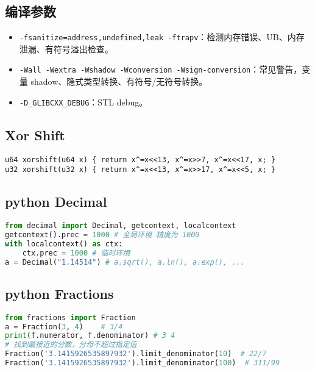\documentclass[a4paper,landscape,twocolumn]{ctexart}
\begin{document}
\subsection{编译参数}

\begin{itemize}
\item \texttt{-fsanitize=address,undefined,leak -ftrapv}：检测内存错误、UB、内存泄漏、有符号溢出检查。
\item \texttt{-Wall -Wextra -Wshadow -Wconversion -Wsign-conversion}：常见警告，变量 shadow、隐式类型转换、有符号/无符号转换。
\item \texttt{-D\_GLIBCXX\_DEBUG}：STL debug。
\end{itemize}

\subsection{Xor \space Shift}

\begin{lstlisting}
u64 xorshift(u64 x) { return x^=x<<13, x^=x>>7, x^=x<<17, x; }
u32 xorshift(u32 x) { return x^=x<<13, x^=x>>17, x^=x<<5, x; }
\end{lstlisting}

\subsection{python Decimal}

\begin{lstlisting}[language=python]
from decimal import Decimal, getcontext, localcontext
getcontext().prec = 1000 # 全局环境 精度为 1000
with localcontext() as ctx:
	ctx.prec = 1000 # 临时环境
a = Decimal("1.14514") # a.sqrt(), a.ln(), a.exp(), ...
\end{lstlisting}

\subsection{python Fractions}

\begin{lstlisting}[language=python]
from fractions import Fraction
a = Fraction(3, 4)    # 3/4
print(f.numerator, f.denominator) # 3 4
# 找到最接近的分数，分母不超过指定值
Fraction('3.1415926535897932').limit_denominator(10)  # 22/7
Fraction('3.1415926535897932').limit_denominator(100)  # 311/99
\end{lstlisting}
\end{document}
